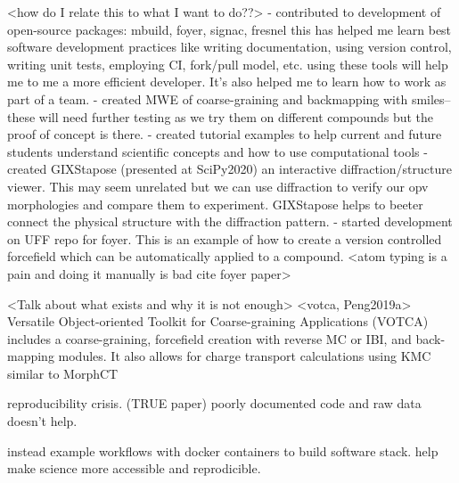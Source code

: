 <how do I relate this to what I want to do??>
- contributed to development of open-source packages: mbuild, foyer, signac, fresnel
 this has helped me learn best software development practices like writing documentation, using version control, writing unit tests, employing CI, fork/pull model, etc.
using these tools will help me to me a more efficient developer.
It's also helped me to learn how to work as part of a team.
 - created MWE of coarse-graining and backmapping with smiles-- these will need further testing as we try them on different compounds but the proof of concept is there.
 - created tutorial examples to help current and future students understand scientific concepts and how to use computational tools
 - created GIXStapose (presented at SciPy2020) an interactive diffraction/structure viewer.
This may seem unrelated but we can use diffraction to verify our opv morphologies and compare them to experiment.
GIXStapose helps to beeter connect the physical structure with the diffraction pattern.
- started development on UFF repo for foyer.
This is an example of how to create a version controlled forcefield which can be automatically applied to a compound.
<atom typing is a pain and doing it manually is bad cite foyer paper>

<Talk about what exists and why it is not enough>
<votca, Peng2019a> 
Versatile Object-oriented Toolkit for Coarse-graining Applications (VOTCA) \cite{Ruhle2011b}
includes a coarse-graining, forcefield creation with reverse MC or IBI, and back-mapping modules.
It also allows for charge transport calculations using KMC similar to MorphCT \cite{Lukyanov2010}

reproducibility crisis.\cite{Cummings2019} \cite{Thompson2020} (TRUE paper) poorly documented code and raw data doesn't help.

instead example workflows with docker containers to build software stack.
help make science more accessible and reprodicible.

